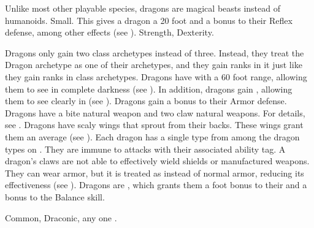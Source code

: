    Unlike most other playable species, dragons are magical beasts instead of humanoids.
   Small. This gives a dragon a 20 foot  and a  bonus to their Reflex defense, among other effects (see ).
    Strength,  Dexterity.
  \begin{itemize}
     Dragons only gain two class archetypes instead of three.
      Instead, they treat the Dragon archetype as one of their archetypes, and they gain ranks in it just like they gain ranks in class archetypes.
     Dragons have  with a 60 foot range, allowing them to see in complete darkness (see ).
      In addition, dragons gain , allowing them to see clearly in  (see ).
     Dragons gain a  bonus to their Armor defense.
     Dragons have a bite natural weapon and two claw natural weapons.
      For details, see .
     Dragons have scaly wings that sprout from their backs.
      These wings grant them an average  (see ).
     Each dragon has a single type from among the dragon types on .
      They are immune to attacks with their associated ability tag.
     A dragon's claws are not able to effectively wield shields or manufactured weapons.
      They can wear armor, but it is treated as  instead of normal armor, reducing its effectiveness (see ).
     Dragons are , which grants them a  foot bonus to their  and a  bonus to the Balance skill.
  \end{itemize}
   Common, Draconic, any one .


